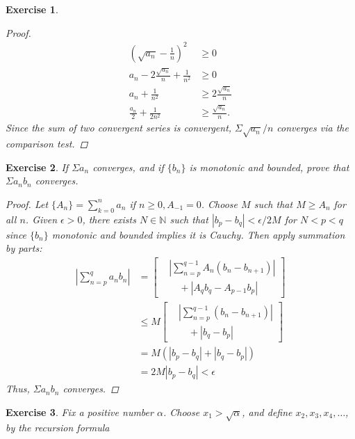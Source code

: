 \documentclass[10pt,letterpaper]{amsart}
\newtheorem{exercise}{Exercise}[section]
\theoremstyle{definition}
\theoremstyle{remark}
\numberwithin{equation}{exercise}
\begin{document}
\begin{multicols}{2}
\begin{exercise}
\begin{proof}
      \begin{align*}
        \left(\sqrt{a_n} - \frac{1}{n}\right)^2 &\ge 0\\
        a_n - 2 \frac{\sqrt{a_n}}{n} + \frac{1}{n^2} &\ge 0\\
        a_n + \frac{1}{n^2} &\ge 2\frac{\sqrt{a_n}}{n}\\
        \frac{a_n}{2} + \frac{1}{2n^2} &\ge \frac{\sqrt{a_n}}{n}.
      \end{align*}
      Since the sum of two convergent series is convergent, $\Sigma \sqrt{a_n}/n$ converges via the comparison test.
    \end{proof}
  \end{exercise}
  \begin{exercise}\label{3.8}
    If $\Sigma a_n$ converges, and if $\{b_n\}$ is monotonic and bounded, prove that $\Sigma a_nb_n$ converges.
    \begin{proof}
      Let $\{A_n\} = \sum^n_{k=0} a_n$ if $n \ge 0, A_{-1} = 0$. Choose $M$ such that $M \ge A_n$ for all $n$. Given $\epsilon > 0$, there exists $N \in \mathbb{N}$ such that $|b_p - b_q| < \epsilon/2M$ for $N < p < q$ since $\{b_n\}$ monotonic and bounded implies it is Cauchy. Then apply summation by parts:
      \begin{align*}
        \left| \sum^q_{n=p} a_nb_n \right| &= \left[
        \begin{aligned}
          &\left| \sum^{q-1}_{n=p} A_n(b_n - b_{n+1}) \right|\\
          &\quad+ | A_qb_q - A_{p-1}b_p|
        \end{aligned} \right]\\
        &\le M\left[
        \begin{aligned}
          &\left| \sum^{q-1}_{n=p} (b_n - b_{n+1}) \right|\\
          &\quad+ | b_q - b_p|
        \end{aligned}\right]\\
        &= M\left(|b_p-b_q| + |b_q-b_p|\right)\\
        &= 2M|b_p-b_q| < \epsilon
      \end{align*}
      Thus, $\Sigma a_nb_n$ converges.
    \end{proof}
  \end{exercise}
  \setcounter{exercise}{15}
  \begin{exercise}\label{3.16}
    Fix a positive number $\alpha$. Choose $x_1 > \sqrt{\alpha}$, and define $x_2, x_3, x_4, \ldots$, by the recursion formula
    \begin{equation}\label{3.16a}

\end{equation}
\end{exercise}
\end{multicols}
\end{document}
